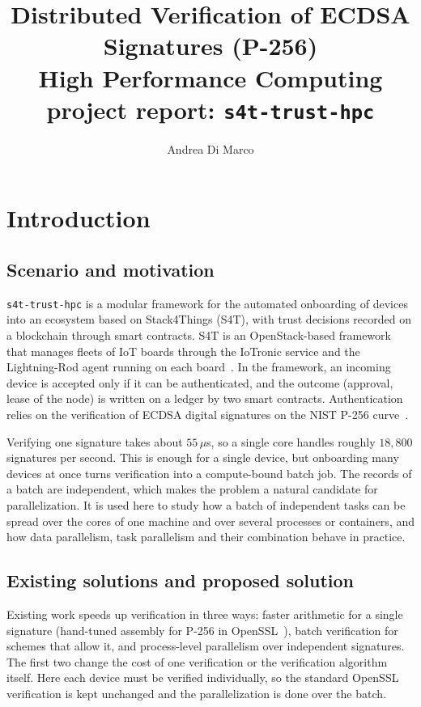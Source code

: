 \documentclass[10pt,a4paper]{article}
\title{\textbf{Distributed Verification of ECDSA Signatures (P-256)} \\[0.1cm]
\large High Performance Computing project report: \texttt{s4t-trust-hpc}}
\author{Andrea Di Marco}
\date{}
\begin{document}
\maketitle
\vspace{-0.9cm}

\section{Introduction}

\subsection{Scenario and motivation}

\texttt{s4t-trust-hpc} is a modular framework for the automated onboarding of devices into an ecosystem based on Stack4Things (S4T), with trust decisions recorded on a blockchain through smart contracts. S4T is an OpenStack-based framework that manages fleets of IoT boards through the IoTronic service and the Lightning-Rod agent running on each board~\cite{s4t}. In the framework, an incoming device is accepted only if it can be authenticated, and the outcome (approval, lease of the node) is written on a ledger by two smart contracts. Authentication relies on the verification of ECDSA digital signatures on the NIST P-256 curve~\cite{fips186}.

Verifying one signature takes about $55\,\mu$s, so a single core handles roughly $18{,}800$ signatures per second. This is enough for a single device, but onboarding many devices at once turns verification into a compute-bound batch job. The records of a batch are independent, which makes the problem a natural candidate for parallelization. It is used here to study how a batch of independent tasks can be spread over the cores of one machine and over several processes or containers, and how data parallelism, task parallelism and their combination behave in practice.

\subsection{Existing solutions and proposed solution}

Existing work speeds up verification in three ways: faster arithmetic for a single signature (hand-tuned assembly for P-256 in OpenSSL~\cite{gueron}), batch verification for schemes that allow it, and process-level parallelism over independent signatures. The first two change the cost of one verification or the verification algorithm itself. Here each device must be verified individually, so the standard OpenSSL verification is kept unchanged and the parallelization is done over the batch.
\end{document}
